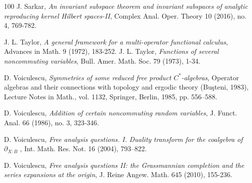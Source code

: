 \documentclass[12pt]{amsart}%
\numberwithin{equation}{section}
\begin{document}
\begin{thebibliography}{100}
 J. Sarkar, {\em An invariant subspace theorem and invariant subspaces of analytic reproducing kernel Hilbert spaces-II}, Complex Anal. Oper. Theory 10 (2016), no. 4, 769-782.


 J. L. Taylor, {\em A general framework for a multi-operator functional calculus}, Advances in Math. 9 (1972), 183-252.
 J. L. Taylor, {\em Functions of several noncommuting variables}, Bull. Amer. Math. Soc. 79 (1973), 1-34. 

 D. Voiculescu, {\em Symmetries of some reduced free product $C^*$-algebras}, Operator algebras and their connections with topology and ergodic theory (Bu\c{s}teni, 1983), Lecture Notes in Math., vol. 1132, Springer, Berlin, 1985, pp. 556–588.

 D. Voiculescu, {\em Addition of certain noncommuting random variables}, J. Funct. Anal. 66 (1986), no. 3, 323-346.

 D. Voiculescu, {\em Free analysis questions. I. Duality transform for the coalgebra of $\partial_{X : B}$ }, Int. Math. Res. Not. 16 (2004), 793–822.

 D. Voiculescu, {\em Free analysis questions II: the Grassmannian completion and the series expansions at the origin}, J. Reine Angew. Math. 645 (2010), 155-236.

\end{thebibliography}
\end{document}
